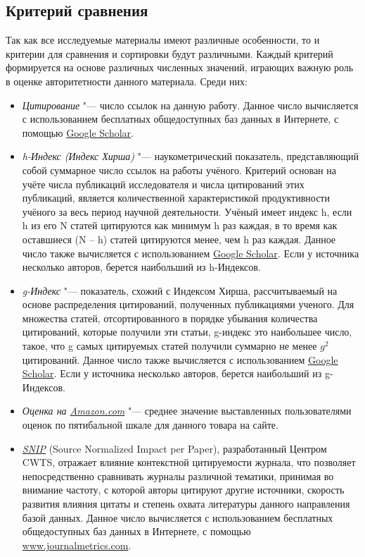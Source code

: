 \documentclass{article}
\begin{document}
	\subsection{Критерий сравнения}
	Так как все исследуемые материалы имеют различные особенности, то и критерии для сравнения и сортировки будут различными. Каждый критерий формируется на основе различных численных значений, играющих важную роль в оценке авторитетности данного материала. Среди них:
	\begin{itemize}
		\item \textit{Цитирование} "--- число ссылок на данную работу. Данное число вычисляется с использованием бесплатных общедоступных баз данных в Интернете, с помощью \href{http://scholar.google.ru/schhp?hl=ru&as_sdt=0,5}{Google Scholar}.
		\item \textit{h-Индекс (Индекс Хирша)} "--- наукометрический показатель, представляющий собой суммарное число ссылок на работы учёного. Критерий основан на учёте числа публикаций исследователя и числа цитирований этих публикаций, является количественной характеристикой продуктивности учёного за весь период научной деятельности. Учёный имеет индекс h, если h из его N статей цитируются как минимум h раз каждая, в то время как оставшиеся (N – h) статей цитируются менее, чем h раз каждая. Данное число также вычисляется с использованием \href{http://scholar.google.ru/schhp?hl=ru&as_sdt=0,5}{Google Scholar}. Если у источника несколько авторов, берется наибольший из h-Индексов.
		\item \textit{g-Индекс} "--- показатель, схожий с Индексом Хирша, рассчитываемый на основе распределения цитирований, полученных публикациями ученого. Для множества статей, отсортированного в порядке убывания количества цитирований, которые получили эти статьи, g-индекс это наибольшее число, такое, что g самых цитируемых статей получили суммарно не менее $g^2$ цитирований. Данное число также вычисляется с использованием \href{http://scholar.google.ru/schhp?hl=ru&as_sdt=0,5}{Google Scholar}. Если у источника несколько авторов, берется наибольший из g-Индексов.
		\item \textit{Оценка на \href{http://www.amazon.com/}{Amazon.com}} "--- среднее значение выставленных пользователями оценок по пятибальной шкале для данного товара на сайте. 
		\item \textit{\href{http://arxiv.org/abs/0911.2632}{SNIP}} (Source Normalized Impact per Paper), разработанный Центром CWTS, отражает влияние контекстной цитируемости журнала, что позволяет непосредственно сравнивать журналы различной тематики, принимая во внимание частоту, с которой авторы цитируют другие источники, скорость развития влияния цитаты и степень охвата литературы данного направления базой данных. Данное число вычисляется с использованием бесплатных общедоступных баз данных в Интернете, с помощью \href{http://www.journalmetrics.com/}{www.journalmetrics.com}.

\end{itemize}
\end{document}
